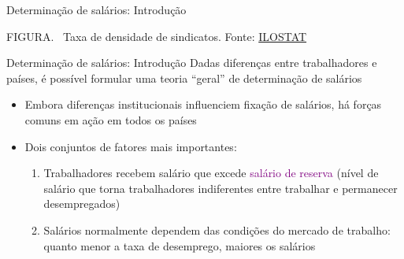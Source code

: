 \documentclass[10pt]{beamer}
\begin{document}
\begin{frame}{Determinação de salários: Introdução}
    \begin{center}
		\begin{minipage}[b]{.6\textwidth}
			\tiny{{\scshape FIGURA}. \ Taxa de densidade de sindicatos. Fonte: \href{https://ilostat.ilo.org/topics/union-membership/}{ILOSTAT}} 
		\end{minipage}
	\end{center}
\end{frame}

\begin{frame}
    {Determinação de salários: Introdução}
     Dadas diferenças entre trabalhadores e países, é possível formular uma teoria ``geral'' de determinação de salários\bigskip
    \begin{itemize}        
        \item Embora diferenças institucionais influenciem fixação de salários, há forças comuns em ação em todos os países\bigskip
        \item Dois conjuntos de fatores mais importantes:\medskip
        \begin{enumerate}
            \item Trabalhadores recebem salário que excede \textcolor{purple}{salário de reserva} (nível de salário que torna trabalhadores indiferentes entre trabalhar e permanecer desempregados)\medskip
            \item Salários normalmente dependem das condições do mercado de trabalho: quanto menor a taxa de desemprego, maiores os salários
        \end{enumerate}
    \end{itemize}
\end{frame}
\end{document}
